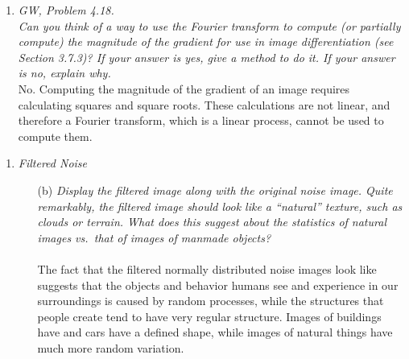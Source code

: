 \documentclass{article}
\begin{document}
\begin{enumerate}
    \pagebreak
    \item \textit{GW, Problem 4.18.\\
    Can you think of a way to use the Fourier transform to compute (or
    partially compute) the magnitude of the gradient for use in image
    differentiation (see Section 3.7.3)? If your answer is yes, give a method
    to do it. If your answer is no, explain why.}\\
    \linebreak
    No. Computing the magnitude of the gradient of an image requires
    calculating squares and square roots. These calculations are not linear,
    and therefore a Fourier transform, which is a linear process, cannot be
    used to compute them.\\
  \end{enumerate}

  \begin{enumerate}
    \item \textit{Filtered Noise}
    \begin{enumerate}
      \item[(b)] \textit{
      Display the filtered image along with the
      original noise image.  Quite remarkably, the filtered image should
      look like a ``natural'' texture, such as clouds or terrain.  What does
      this suggest about the statistics of natural images vs.\ that of
      images of manmade objects?}\\
      \\
      The fact that the filtered normally distributed noise images look like
      suggests that the objects and behavior humans see and experience in our
      surroundings is caused by random processes, while the structures that
      people create tend to have very regular structure. Images of buildings
      have and cars have a defined shape, while images of natural things have
      much more random variation.
    \end{enumerate}
  \end{enumerate}
\end{document}
